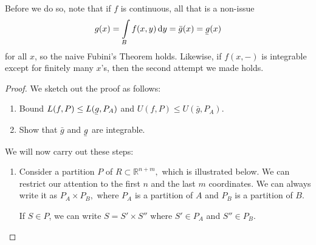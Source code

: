 \documentclass{article}
\newcommand{\ubar}[1]{\underaccent{\bar}{#1}}
\begin{document}
Before we do so, note that if $f$ is continuous, all that is a non-issue
\begin{equation}
    g(x) = \int\limits_B f(x,y) \dd{y} = \bar{g}(x)=\ubar{g}(x)
\end{equation}
for all $x$, so the naive Fubini's Theorem holds. Likewise, if $f(x,-)$ is integrable except for finitely many $x$'s, then the second attempt we made holds.
\begin{proof}
    We sketch out the proof as follows:
    \begin{enumerate}
        \item Bound $L(f,P) \le L(\ubar{g},P_A)$ and $U(f,P) \le U(\bar{g}, P_A)$.
        \item Show that $\bar{g}$ and $\ubar{g}$ are integrable.
    \end{enumerate}
    We will now carry out these steps:
    \begin{enumerate}
        \item Consider a partition $P$ of $R \subset \mathbb{R}^{n+m},$ which is illustrated below. We can restrict our attention to the first $n$ and the last $m$ coordinates. We can always write it as $P_A \times P_B,$ where $P_A$ is a partition of $A$ and $P_B$ is a partition of $B$.
              \begin{center}
              \end{center}
              If $S\in P$, we can write $S = S'\times S''$ where $S' \in P_A$ and $S'' \in P_B$.


\end{enumerate}
\end{proof}
\end{document}
